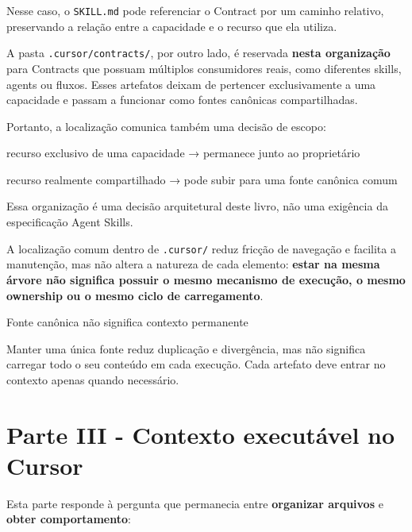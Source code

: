 \documentclass[
  10pt,
  a4paper,
  oneside]{book}
\newenvironment{Shaded}{}{}
\newcommand{\NormalTok}[1]{#1}
\renewenvironment{Shaded}{\begin{snugshade}}{\end{snugshade}}%
\begin{document}
Nesse caso, o \texttt{SKILL.md} pode referenciar o Contract por um
caminho relativo, preservando a relação entre a capacidade e o recurso
que ela utiliza.

A pasta \texttt{.cursor/contracts/}, por outro lado, é reservada
\textbf{nesta organização} para Contracts que possuam múltiplos
consumidores reais, como diferentes skills, agents ou fluxos. Esses
artefatos deixam de pertencer exclusivamente a uma capacidade e passam a
funcionar como fontes canônicas compartilhadas.

Portanto, a localização comunica também uma decisão de escopo:

\begin{Shaded}
\begin{Highlighting}[]
\NormalTok{recurso exclusivo de uma capacidade}
\NormalTok{→ permanece junto ao proprietário}

\NormalTok{recurso realmente compartilhado}
\NormalTok{→ pode subir para uma fonte canônica comum}
\end{Highlighting}
\end{Shaded}

Essa organização é uma decisão arquitetural deste livro, não uma
exigência da especificação Agent Skills.

A localização comum dentro de \texttt{.cursor/} reduz fricção de
navegação e facilita a manutenção, mas não altera a natureza de cada
elemento: \textbf{estar na mesma árvore não significa possuir o mesmo
mecanismo de execução, o mesmo ownership ou o mesmo ciclo de
carregamento}.

\begin{warningbox}{Fonte canônica não significa contexto permanente}

Manter uma única fonte reduz duplicação e divergência, mas não significa
carregar todo o seu conteúdo em cada execução. Cada artefato deve entrar
no contexto apenas quando necessário.

\end{warningbox}

\newpage

\hypertarget{parte-iii---contexto-executuxe1vel-no-cursor}{%
\chapter{Parte III - Contexto executável no
Cursor}\label{parte-iii---contexto-executuxe1vel-no-cursor}}

Esta parte responde à pergunta que permanecia entre \textbf{organizar
arquivos} e \textbf{obter comportamento}:
\end{document}
